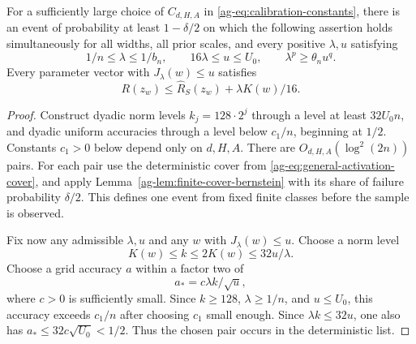 \begin{lemma}
\label{ag-lem:common-statistical}
For a sufficiently large choice of $C_{d,H,A}$ in \eqref{ag-eq:calibration-constants}, there is an event of probability at least $1-\delta/2$ on which the following assertion holds simultaneously for all widths, all prior scales, and every positive $\lambda,u$ satisfying
\[
 1/n\le\lambda\le1/b_n,\qquad16\lambda\le u\le U_0,
 \qquad\lambda^p\ge\theta_n u^q.
\]
Every parameter vector with $J_\lambda(w)\le u$ satisfies
\begin{equation}
 R(z_w)\le\widehat R_S(z_w)+\lambda K(w)/16.
 \label{ag-eq:local-statistical}
\end{equation}
\end{lemma}
\begin{proof}
Construct dyadic norm levels $k_j=128\cdot2^j$ through a level at least $32U_0n$, and dyadic uniform accuracies through a level below $c_1/n$, beginning at $1/2$. Constants $c_1>0$ below depend only on $d,H,A$. There are $O_{d,H,A}(\log^2(2n))$ pairs. For each pair use the deterministic cover from \eqref{ag-eq:general-activation-cover}, and apply Lemma~\ref{ag-lem:finite-cover-bernstein} with its share of failure probability $\delta/2$. This defines one event from fixed finite classes before the sample is observed.

Fix now any admissible $\lambda,u$ and any $w$ with $J_\lambda(w)\le u$. Choose a norm level
\[
 K(w)\le k\le2K(w)\le32u/\lambda.
\]
Choose a grid accuracy $a$ within a factor two of
\[
 a_* = c\lambda k/\sqrt u,
\]
where $c>0$ is sufficiently small. Since $k\ge128$, $\lambda\ge1/n$, and $u\le U_0$, this accuracy exceeds $c_1/n$ after choosing $c_1$ small enough. Since $\lambda k\le32u$, one also has $a_*\le32c\sqrt{U_0}<1/2$. Thus the chosen pair occurs in the deterministic list.


\end{proof}
